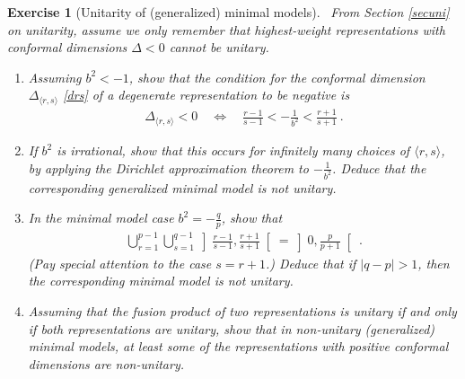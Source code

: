 \documentclass[12pt, a4paper, notitlepage, twoside]{report}
\numberwithin{equation}{section}
\theoremstyle{break}
\newtheorem{exo}{Exercise}[chapter]
\begin{document}
\begin{exo}[Unitarity of (generalized) minimal models]
 ~\label{exoneg}
From Section \ref{secuni} on unitarity, assume we only remember that highest-weight representations with conformal dimensions $\Delta <0$ cannot be unitary. 
\begin{enumerate}
 \item 
Assuming $b^2 < -1$, show that the condition for the conformal dimension $\Delta_{\langle r,s \rangle}$ \eqref{drs} of a degenerate representation to be negative is 
\begin{align}
 \Delta_{\langle r,s \rangle} < 0 \quad \iff \quad \frac{r-1}{s-1} < -\frac{1}{b^2} < \frac{r+1}{s+1} \ .
\end{align}
\item
If $b^2$ is irrational, show that this occurs for infinitely many choices of $\langle r,s \rangle$, by applying the Dirichlet approximation theorem to $-\frac{1}{b^2}$. 
Deduce that the corresponding generalized minimal model is not unitary. 
\item
In the minimal model case $b^2 = -\frac{q}{p}$, show that 
\begin{align}
 \bigcup_{r=1}^{p-1}\bigcup_{s=1}^{q-1} \left] \frac{r-1}{s-1} , \frac{r+1}{s+1} \right[  = \left]0, \frac{p}{p+1}\right[ \ .
\end{align}
(Pay special attention to the case $s=r+1$.) Deduce that if $|q-p|>1$, then the corresponding minimal model is not unitary.
\item
Assuming that the fusion product of two representations is unitary if and only if both representations are unitary, show that in non-unitary (generalized) minimal models, at least some of the representations with positive conformal dimensions are non-unitary.
\end{enumerate}
\end{exo}
\end{document}
